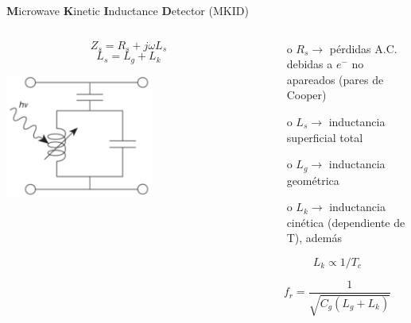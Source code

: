 \documentclass[ignorenonframetext,12pt]{beamer}
\begin{document}
\begin{frame}{\textbf{M}icrowave \textbf{K}inetic \textbf{I}nductance
				\textbf{D}etector (MKID)}
				\begin{columns}
								\begin{column}{0.49\textwidth}
												\begin{equation*}
																Z_s = R_s + j \omega L_s
												\end{equation*}
												\begin{equation*}
																L_s = L_g + L_k
												\end{equation*}

												\flushleft	\includegraphics[width=0.6\textwidth]{LCR_mkid}
								\end{column}
								\begin{column}{0.59\textwidth}
												\begin{itemize}
																\item[o] $R_s \to$ pérdidas A.C. debidas a $e^-$ no apareados
																				(pares de Cooper)
																\item[o] $L_s \to$ inductancia superficial total
																\item[o] $L_g \to$ inductancia geométrica
																\item[o] $L_k \to$ inductancia cinética
																				({\color{blue}dependiente de T}), además
												\end{itemize}

												\begin{equation*}
																L_k \propto 1/T_c
												\end{equation*}

												\begin{equation*}
																f_r = \frac{1}{\sqrt{C_g(L_g + L_k)}}
												\end{equation*}
								\end{column}
				\end{columns}
\end{frame}
\end{document}

